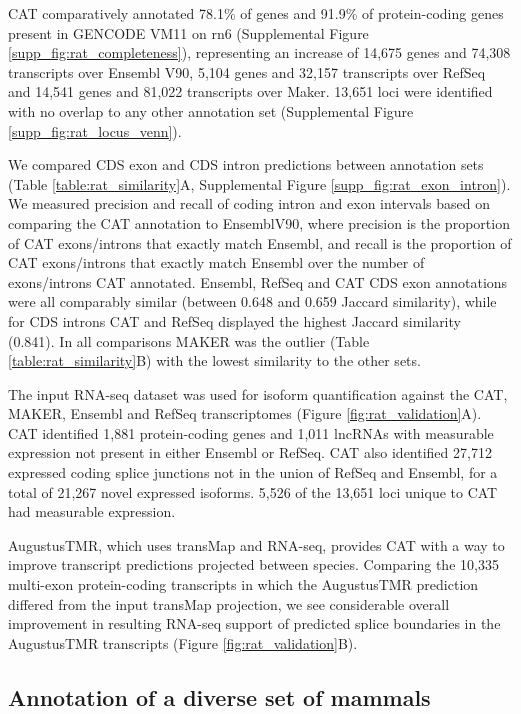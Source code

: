 \documentclass[fleqn,10pt]{wlscirep}
\begin{document}
CAT comparatively annotated 78.1\% of genes and 91.9\% of protein-coding genes present in GENCODE VM11 on rn6 (Supplemental Figure \ref{supp_fig:rat_completeness}), representing an increase of 14,675 genes and 74,308 transcripts over Ensembl V90, 5,104 genes and 32,157 transcripts over RefSeq and 14,541 genes and 81,022 transcripts over Maker. 13,651 loci were identified with no overlap to any other annotation set (Supplemental Figure \ref{supp_fig:rat_locus_venn}).

We compared CDS exon and CDS intron predictions between annotation sets (Table \ref{table:rat_similarity}A, Supplemental Figure \ref{supp_fig:rat_exon_intron}). We measured precision and recall of coding intron and exon intervals based on comparing the CAT annotation to EnsemblV90, where precision is the proportion of CAT exons/introns that exactly match Ensembl, and recall is the proportion of CAT exons/introns that exactly match Ensembl over the number of exons/introns CAT annotated. Ensembl, RefSeq and CAT CDS exon annotations were all comparably similar (between 0.648 and 0.659 Jaccard similarity), while for CDS introns CAT and RefSeq displayed the highest Jaccard similarity (0.841). In all comparisons MAKER was the outlier (Table \ref{table:rat_similarity}B) with the lowest similarity to the other sets.
  
The input RNA-seq dataset was used for isoform quantification against the CAT, MAKER, Ensembl and RefSeq transcriptomes (Figure \ref{fig:rat_validation}A). CAT identified 1,881 protein-coding genes and 1,011 lncRNAs with measurable expression not present in either Ensembl or RefSeq. CAT also identified 27,712 expressed coding splice junctions not in the union of RefSeq and Ensembl, for a total of 21,267 novel expressed isoforms. 5,526 of the 13,651 loci unique to CAT had measurable expression. 

AugustusTMR, which uses transMap and RNA-seq, provides CAT with a way to improve transcript predictions projected between species. Comparing the 10,335 multi-exon protein-coding transcripts in which the AugustusTMR prediction differed from the input transMap projection, we see considerable overall improvement in resulting RNA-seq support of predicted splice boundaries in the AugustusTMR transcripts (Figure \ref{fig:rat_validation}B). 

\subsection*{Annotation of a diverse set of mammals}
\end{document}
